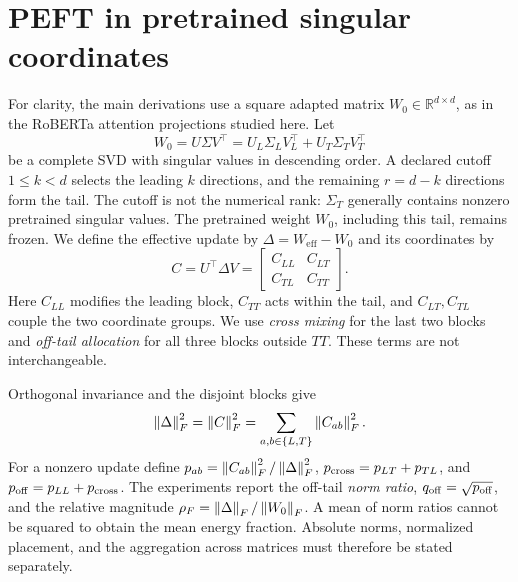 \section{PEFT in pretrained singular coordinates}
\label{sec:coordinates}

For clarity, the main derivations use a square adapted matrix $W_0\in\mathbb R^{d\times d}$, as in the RoBERTa attention projections studied here. Let
\begin{equation}
W_0=U\Sigma V^\top
=U_L\Sigma_L V_L^\top+U_T\Sigma_T V_T^\top
\label{eq:pretrained}
\end{equation}
be a complete SVD with singular values in descending order. A declared cutoff $1\le k<d$ selects the leading $k$ directions, and the remaining $r=d-k$ directions form the tail. The cutoff is not the numerical rank: $\Sigma_T$ generally contains nonzero pretrained singular values. The pretrained weight $W_0$, including this tail, remains frozen. We define the effective update by $\Delta=W_{\mathrm{eff}}-W_0$ and its coordinates by
\begin{equation}
C=U^\top\Delta V=
\begin{bmatrix}C_{LL}&C_{LT}\\C_{TL}&C_{TT}\end{bmatrix}.
\label{eq:coordinates}
\end{equation}
Here $C_{LL}$ modifies the leading block, $C_{TT}$ acts within the tail, and $C_{LT},C_{TL}$ couple the two coordinate groups. We use \emph{cross mixing} for the last two blocks and \emph{off-tail allocation} for all three blocks outside $TT$. These terms are not interchangeable.

Orthogonal invariance and the disjoint blocks give
\begin{equation}
\left\|\Delta\right\|_F^2=\left\|C\right\|_F^2=\sum_{a,b\in\{L,T\}}\left\|C_{ab}\right\|_F^2.
\label{eq:energy}
\end{equation}
For a nonzero update define $p_{ab}=\left\|C_{ab}\right\|_F^2/\left\|\Delta\right\|_F^2$, $p_{\mathrm{cross}}=p_{LT}+p_{TL}$, and $p_{\mathrm{off}}=p_{LL}+p_{\mathrm{cross}}$. The experiments report the off-tail \emph{norm ratio}, $q_{\mathrm{off}}=\sqrt{p_{\mathrm{off}}}$, and the relative magnitude $\rho_F=\left\|\Delta\right\|_F/\left\|W_0\right\|_F$. A mean of norm ratios cannot be squared to obtain the mean energy fraction. Absolute norms, normalized placement, and the aggregation across matrices must therefore be stated separately.

